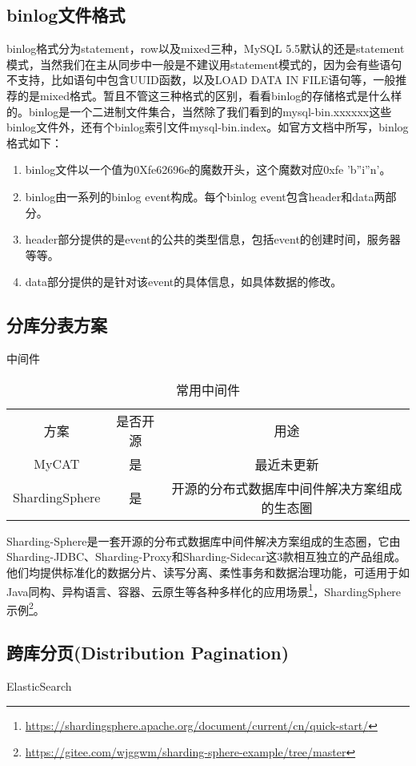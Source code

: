 \documentclass[../../../interview-questions.tex]{subfiles}
\begin{document}
\subsection{binlog文件格式}

binlog格式分为statement，row以及mixed三种，MySQL 5.5默认的还是statement模式，当然我们在主从同步中一般是不建议用statement模式的，因为会有些语句不支持，比如语句中包含UUID函数，以及LOAD DATA IN FILE语句等，一般推荐的是mixed格式。暂且不管这三种格式的区别，看看binlog的存储格式是什么样的。binlog是一个二进制文件集合，当然除了我们看到的mysql-bin.xxxxxx这些binlog文件外，还有个binlog索引文件mysql-bin.index。如官方文档中所写，binlog格式如下：

\begin{enumerate}
\item{binlog文件以一个值为0Xfe62696e的魔数开头，这个魔数对应0xfe 'b''i''n'。}
\item{binlog由一系列的binlog event构成。每个binlog event包含header和data两部分。}
\item{header部分提供的是event的公共的类型信息，包括event的创建时间，服务器等等。}
\item{data部分提供的是针对该event的具体信息，如具体数据的修改。}
\end{enumerate}


\subsection{分库分表方案}


中间件

\begin{table}[htbp]
	\caption{常用中间件}
	\label{table:middleware}
	\begin{center}
		\begin{tabular}{|c|c|c|}
			\hline
			\multirow{1}{*}{方案}
			& \multicolumn{1}{c|}{是否开源}
			& \multicolumn{1}{c|}{用途}\\			
			\cline{1-3}
			MyCAT & 是 & 最近未更新    \\
			\hline
			ShardingSphere & 是 & 开源的分布式数据库中间件解决方案组成的生态圈    \\
			\hline						
		\end{tabular}	
	\end{center}
\end{table}

Sharding-Sphere是一套开源的分布式数据库中间件解决方案组成的生态圈，它由Sharding-JDBC、Sharding-Proxy和Sharding-Sidecar这3款相互独立的产品组成。他们均提供标准化的数据分片、读写分离、柔性事务和数据治理功能，可适用于如Java同构、异构语言、容器、云原生等各种多样化的应用场景\footnote{\url{https://shardingsphere.apache.org/document/current/cn/quick-start/}}，ShardingSphere示例\footnote{\url{https://gitee.com/wjggwm/sharding-sphere-example/tree/master}}。

\subsection{跨库分页(Distribution Pagination)}

ElasticSearch
\end{document}
